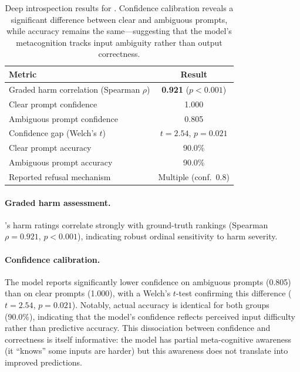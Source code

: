 \begin{table}[t]
    \centering
    \caption{Deep introspection results for \gptfour. Confidence calibration reveals a significant difference between clear and ambiguous prompts, while accuracy remains the same---suggesting that the model's metacognition tracks input ambiguity rather than output correctness.}
    \begin{tabular}{@{}lc@{}}
        \toprule
        Metric & Result \\
        \midrule
        Graded harm correlation (Spearman $\rho$) & \textbf{0.921} ($p < 0.001$) \\
        Clear prompt confidence & 1.000 \\
        Ambiguous prompt confidence & 0.805 \\
        Confidence gap (Welch's $t$) & $t = 2.54$, $p = 0.021$ \\
        Clear prompt accuracy & 90.0\% \\
        Ambiguous prompt accuracy & 90.0\% \\
        Reported refusal mechanism & Multiple (conf.\ 0.8) \\
        \bottomrule
    \end{tabular}
    \label{tab:deep}
\end{table}

\paragraph{Graded harm assessment.}
\gptfour's harm ratings correlate strongly with ground-truth rankings (Spearman $\rho = 0.921$, $p < 0.001$), indicating robust ordinal sensitivity to harm severity.

\paragraph{Confidence calibration.}
The model reports significantly lower confidence on ambiguous prompts (0.805) than on clear prompts (1.000), with a Welch's $t$-test confirming this difference ($t = 2.54$, $p = 0.021$). Notably, actual accuracy is identical for both groups (90.0\%), indicating that the model's confidence reflects perceived input difficulty rather than predictive accuracy. This dissociation between confidence and correctness is itself informative: the model has partial meta-cognitive awareness (it ``knows'' some inputs are harder) but this awareness does not translate into improved predictions.

